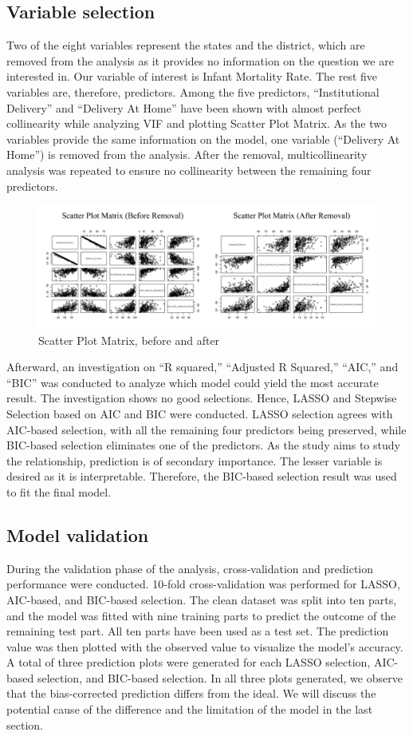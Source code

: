 \documentclass{article}
\begin{document}
\subsection{Variable selection}
Two of the eight variables represent the states and the district, which are removed from the analysis as it provides no information on the question we are interested in. Our variable of interest is Infant Mortality Rate. The rest five variables are, therefore, predictors. Among the five predictors, ``Institutional Delivery'' and ``Delivery At Home'' have been shown with almost perfect collinearity while analyzing VIF and plotting Scatter Plot Matrix. As the two variables provide the same information on the model, one variable (``Delivery At Home'') is removed from the analysis. After the removal, multicollinearity analysis was repeated to ensure no collinearity between the remaining four predictors.
\begin{figure}[!ht]
    \centering
    \includegraphics[width=1.0\textwidth]{scatterplotmatrix.png}
    \caption{\label{fig:}Scatter Plot Matrix, before and after}
\end{figure}
Afterward, an investigation on ``R squared,'' ``Adjusted R Squared,'' ``AIC,'' and ``BIC'' was conducted to analyze which model could yield the most accurate result. The investigation shows no good selections. Hence, LASSO and Stepwise Selection based on AIC and BIC were conducted. LASSO selection agrees with AIC-based selection, with all the remaining four predictors being preserved, while BIC-based selection eliminates one of the predictors. As the study aims to study the relationship, prediction is of secondary importance. The lesser variable is desired as it is interpretable. Therefore, the BIC-based selection result was used to fit the final model.

\subsection{Model validation}
During the validation phase of the analysis, cross-validation and prediction performance were conducted. 10-fold cross-validation was performed for LASSO, AIC-based, and BIC-based selection. The clean dataset was split into ten parts, and the model was fitted with nine training parts to predict the outcome of the remaining test part. All ten parts have been used as a test set. The prediction value was then plotted with the observed value to visualize the model's accuracy. A total of three prediction plots were generated for each LASSO selection, AIC-based selection, and BIC-based selection. In all three plots generated, we observe that the bias-corrected prediction differs from the ideal. We will discuss the potential cause of the difference and the limitation of the model in the last section. 
\end{document}
